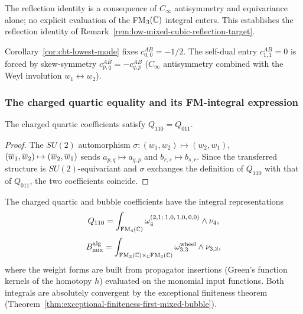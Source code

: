 \begin{remark}
\label{rem:cubic-reflection-structural}
The reflection identity is a consequence of $C_\infty$ antisymmetry
and equivariance alone; no explicit evaluation of the FM$_3(\mathbb C)$
integral enters. This establishes the reflection identity of
Remark~\ref{rem:low-mixed-cubic-reflection-target}.
\end{remark}

Corollary~\ref{cor:cbt-lowest-mode} fixes $c^{AB}_{0,0}=-1/2$. The
self-dual entry $c^{AB}_{1,1}=0$ is forced by skew-symmetry
$c^{AB}_{p,q}=-c^{AB}_{q,p}$ ($C_\infty$ antisymmetry combined with
the Weyl involution $w_1\leftrightarrow w_2$).

\subsubsection*{The charged quartic equality and its FM-integral expression}

\begin{theorem}
\label{thm:charged-quartic-equality}
The charged quartic coefficients satisfy $Q_{110}=Q_{011}$.
\end{theorem}

\begin{proof}
The $SU(2)$ automorphism $\sigma:(w_1,w_2)\mapsto(w_2,w_1)$,
$(\overline{w}_1,\overline{w}_2)\mapsto(\overline{w}_2,\overline{w}_1)$ sends $a_{p,q}\mapsto a_{q,p}$ and
$b_{r,s}\mapsto b_{s,r}$. Since the transferred structure is $SU(2)$-equivariant and
$\sigma$ exchanges the definition of $Q_{110}$ with that of $Q_{011}$, the two
coefficients coincide.
\end{proof}

\begin{proposition}
\label{prop:fm-integral-expressions}
The charged quartic and bubble coefficients have the integral representations
\begin{equation}
\label{eq:q110-integral}
Q_{110}
=
\int_{\mathrm{FM}_4(\mathbb C)}
\omega_4^{(2,1;\;1,0,\,1,0,\,0,0)}\wedge\nu_4,
\end{equation}
\begin{equation}
\label{eq:bmix-integral}
B_{\mathrm{mix}}^{\mathrm{alg}}
=
\int_{\mathrm{FM}_3(\mathbb C)\times_{\mathbb C}\mathrm{FM}_3(\mathbb C)}
\omega_{3,3}^{\mathrm{wheel}}\wedge\nu_{3,3},
\end{equation}
where the weight forms are built from propagator insertions (Green's function kernels of
the homotopy $h$) evaluated on the monomial input functions. Both integrals are absolutely
convergent by the exceptional finiteness theorem
(Theorem~\ref{thm:exceptional-finiteness-first-mixed-bubble}).
\end{proposition}

